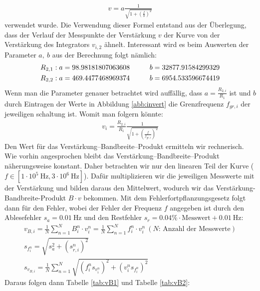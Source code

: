 \begin{gather}
    v = a \frac{1}{\sqrt{1+\left(\frac{f}{b}\right)^2}}
\end{gather}
verwendet wurde. Die Verwendung dieser Formel entstand aus der Überlegung, dass der Verlauf der Messpunkte der Verstärkung $v$ der Kurve von der Verstärkung des Integrators $v_{i,2}$ ähnelt. Interessant wird es beim Auswerten der Parameter $a,~b$ aus der Berechnung folgt nämlich:
\begin{gather}
    R_{2,1}: a = 98.98181807063608 \hspace*{1cm} b = 32877.91584299329 \\
    R_{2,2}: a = 469.4477468969374 \hspace*{1cm} b = 6954.533596674419
\end{gather}
Wenn man die Parameter genauer betrachtet wird auffällig, dass $a=\frac{R_{2,i}}{R_1}$ ist und $b$ durch Eintragen der Werte in Abbildung \ref{abb:invert} die Grenzfrequenz $f_{gr,i}$ der jeweiligen schaltung ist. Womit man folgern könnte:
\begin{gather}
    v_i = \frac{R_{2,i}}{R_1} \frac{1}{\sqrt{1+\left(\frac{f}{f_{gr,i}}\right)^2}}
\end{gather}
Den Wert für das Verstärkung–Bandbreite–Produkt ermitteln wir rechnerisch. Wie vorhin angesprochen bleibt das Verstärkung–Bandbreite–Produkt näherungsweise konstant. Daher betrachten wir nur den linearen Teil der Kurve ($f\in[1\cdot10^5~\text{Hz},3\cdot10^6~\text{Hz}]$). Dafür multiplizieren wir die jeweiligen Messwerte mit der Verstärkung und bilden daraus den Mittelwert, wodurch wir das Verstärkung-Bandbreite-Produkt $B\cdot v$ bekommen. Mit dem Fehlerfortpflanzungsgesetz folgt dann für den Fehler, wobei der Fehler der Frequenz $f$ angegeben ist durch den Ablesefehler $s_a=0.01~\text{Hz}$ und den Restfehler $s_r=0.04\%\cdot\text{Messwert}+0.01~\text{Hz}$:
\begin{gather}
    v_{B,i} = \frac{1}{N}\sum_{n=1}^N B_i^n\cdot v_i^n=\frac{1}{N}\sum_{n=1}^N f_i^n\cdot v_i^n~(N\text{: Anzahl der Messwerte})\\
    s_{f_i^n} = \sqrt{s_a^2+(s_{r,i}^n)^2}\\
    s_{v_{B,i}} = \frac{1}{N}\sum_{n=1}^N \sqrt{(f_i^ns_{v_i^n})^2+(v_i^ns_{f_i^n})^2}
\end{gather}
\newpage
Daraus folgen dann Tabelle \ref{tab:vB1} und Tabelle \ref{tab:vB2}:
